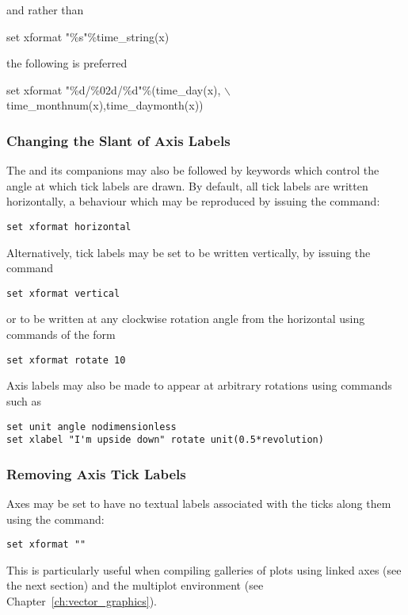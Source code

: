 \noindent and rather than

\begin{dontdo}
set xformat "\%s"\%time\_string(x)
\end{dontdo}

\noindent the following is preferred

\begin{dodo}
set xformat "\%d/\%02d/\%d"\%(time\_day(x), $\backslash$\newline time\_monthnum(x),time\_daymonth(x))
\end{dodo}

\subsubsection{Changing the Slant of Axis Labels}

The  and its companions may also be followed by keywords
which control the angle at which tick labels are drawn. By default, all tick
labels are written horizontally, a behaviour which may be reproduced by issuing
the command:
\begin{verbatim}
set xformat horizontal
\end{verbatim}
Alternatively, tick labels may be set to be written vertically, by issuing the command
\begin{verbatim}
set xformat vertical
\end{verbatim}
or to be written at any clockwise rotation angle from the horizontal using commands of the form
\begin{verbatim}
set xformat rotate 10
\end{verbatim}

Axis labels may also be made to appear at arbitrary rotations using commands such as
\begin{verbatim}
set unit angle nodimensionless
set xlabel "I'm upside down" rotate unit(0.5*revolution)
\end{verbatim}

\subsubsection{Removing Axis Tick Labels}

Axes may be set to have no textual labels associated with the ticks along them
using the command:
\begin{verbatim}
set xformat ""
\end{verbatim}
This is particularly useful when compiling galleries of plots using linked axes
(see the next section) and the multiplot environment (see
Chapter~\ref{ch:vector_graphics}).


